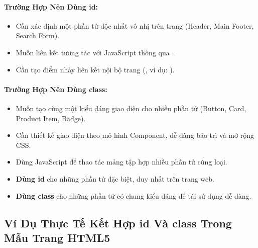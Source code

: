 \paragraph{Trường Hợp Nên Dùng id:}
\begin{itemize}[leftmargin=1.8em, itemsep=3pt, parsep=0pt]
    \item Cần xác định một phần tử độc nhất vô nhị trên trang (Header, Main Footer, Search Form).
    \item Muốn liên kết tương tác với JavaScript thông qua .
    \item Cần tạo điểm nhảy liên kết nội bộ trang (, ví dụ: ).
\end{itemize}

\paragraph{Trường Hợp Nên Dùng class:}
\begin{itemize}[leftmargin=1.8em, itemsep=3pt, parsep=0pt]
    \item Muốn tạo cùng một kiểu dáng giao diện cho nhiều phần tử (Button, Card, Product Item, Badge).
    \item Cần thiết kế giao diện theo mô hình Component, dễ dàng bảo trì và mở rộng CSS.
    \item Dùng JavaScript để thao tác mảng tập hợp nhiều phần tử cùng loại.
\end{itemize}

\begin{conceptBox}
\begin{itemize}[leftmargin=1.5em, itemsep=2pt, parsep=0pt]
    \item \textbf{Dùng id} cho những phần tử đặc biệt, duy nhất trên trang web.
    \item \textbf{Dùng class} cho những phần tử có chung kiểu dáng để tái sử dụng dễ dàng.
\end{itemize}
\end{conceptBox}

\subsection{Ví Dụ Thực Tế Kết Hợp id Và class Trong Mẫu Trang HTML5}

